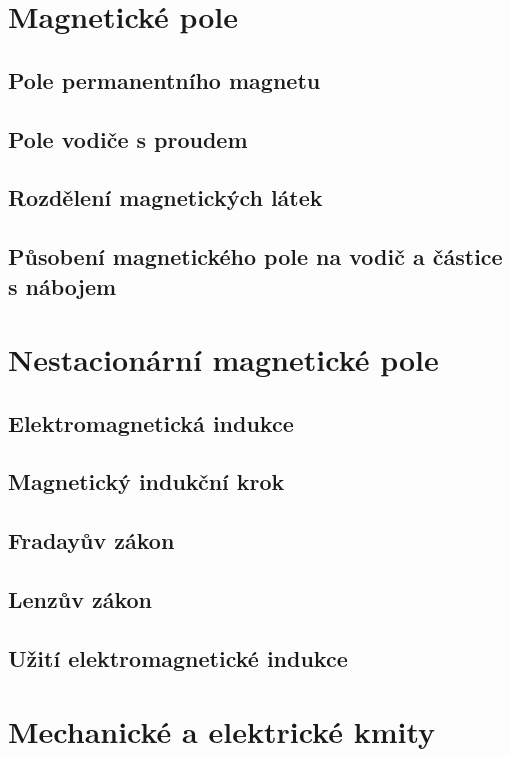 \documentclass[titlepage]{book}
\begin{document}
\chapter{Magnetické pole}
\section{Pole permanentního magnetu}

\section{Pole vodiče s proudem}

\section{Rozdělení magnetických látek}

\section{Působení magnetického pole na vodič a částice s nábojem}

\chapter{Nestacionární magnetické pole}

\section{Elektromagnetická indukce}

\section{Magnetický indukční krok}

\section{Fradayův zákon}

\section{Lenzův zákon}

\section{Užití elektromagnetické indukce}

\chapter{Mechanické a elektrické kmity}
\end{document}
